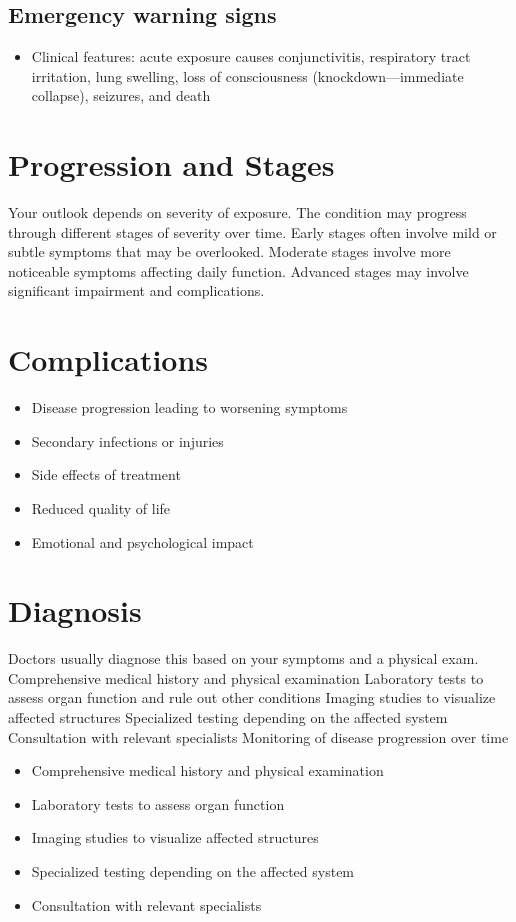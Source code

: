 \subsection{Emergency warning signs}
\begin{itemize}[noitemsep]
  \item Clinical features: acute exposure causes conjunctivitis, respiratory tract irritation, lung swelling, loss of consciousness (knockdown---immediate collapse), seizures, and death
\end{itemize}
\section{Progression and Stages}
Your outlook depends on severity of exposure. The condition may progress through different stages of severity over time. Early stages often involve mild or subtle symptoms that may be overlooked. Moderate stages involve more noticeable symptoms affecting daily function. Advanced stages may involve significant impairment and complications.
\section{Complications}
\begin{itemize}[noitemsep]
  \item Disease progression leading to worsening symptoms
  \item Secondary infections or injuries
  \item Side effects of treatment
  \item Reduced quality of life
  \item Emotional and psychological impact
\end{itemize}
\section{Diagnosis}
Doctors usually diagnose this based on your symptoms and a physical exam. Comprehensive medical history and physical examination Laboratory tests to assess organ function and rule out other conditions Imaging studies to visualize affected structures Specialized testing depending on the affected system Consultation with relevant specialists Monitoring of disease progression over time

\begin{itemize}[noitemsep]
  \item Comprehensive medical history and physical examination
  \item Laboratory tests to assess organ function
  \item Imaging studies to visualize affected structures
  \item Specialized testing depending on the affected system
  \item Consultation with relevant specialists
\end{itemize}
